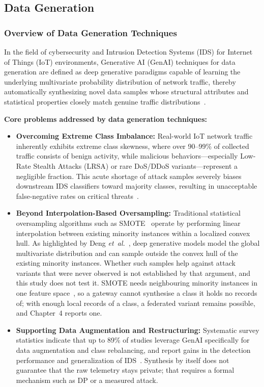\subsection{Data Generation}

\subsubsection*{Overview of Data Generation Techniques}
In the field of cybersecurity and Intrusion Detection Systems (IDS) for Internet of Things (IoT) environments, Generative AI (GenAI) techniques for data generation are defined as deep generative paradigms capable of learning the underlying multivariate probability distribution of network traffic, thereby automatically synthesizing novel data samples whose structural attributes and statistical properties closely match genuine traffic distributions~\cite{deng2025}.

\noindent\textbf{Core problems addressed by data generation techniques:}
\begin{itemize}
    \item \textbf{Overcoming Extreme Class Imbalance:} Real-world IoT network traffic inherently exhibits extreme class skewness, where over 90--99\% of collected traffic consists of benign activity, while malicious behaviors---especially Low-Rate Stealth Attacks (LRSA) or rare DoS/DDoS variants---represent a negligible fraction. This acute shortage of attack samples severely biases downstream IDS classifiers toward majority classes, resulting in unacceptable false-negative rates on critical threats~\cite{deng2025}.
    \item \textbf{Beyond Interpolation-Based Oversampling:} Traditional statistical oversampling algorithms such as SMOTE~\cite{chawla2002} operate by performing linear interpolation between existing minority instances within a localized convex hull. As highlighted by Deng \textit{et~al.}~\cite{deng2025}, deep generative models model the global multivariate distribution and can sample outside the convex hull of the existing minority instances. Whether such samples help against attack variants that were never observed is not established by that argument, and this study does not test it. SMOTE needs neighbouring minority instances in one feature space~\cite{chawla2002}, so a gateway cannot synthesise a class it holds no records of; with enough local records of a class, a federated variant remains possible, and Chapter~4 reports one.
    \item \textbf{Supporting Data Augmentation and Restructuring:} Systematic survey statistics indicate that up to 89\% of studies leverage GenAI specifically for data augmentation and class rebalancing, and report gains in the detection performance and generalization of IDS~\cite{deng2025}. Synthesis by itself does not guarantee that the raw telemetry stays private; that requires a formal mechanism such as DP or a measured attack.
\end{itemize}

